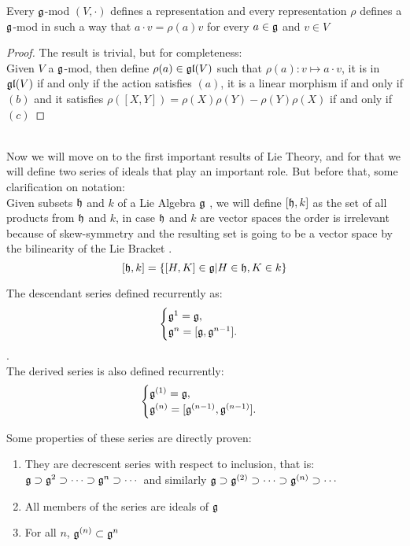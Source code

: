 \begin{prop}
	Every $\mathfrak{g}$-mod $(V,\cdot)$ defines a representation and every representation $\rho$ defines a $\mathfrak{g}$-mod in such a way that $a \cdot v = \rho(a)v$ for every $a \in \mathfrak{g}$ and $v \in V$
	\label{modequivrep}
\end{prop}
\begin{proof}
	The result is trivial, but for completeness:\\
	Given $V$ a $\mathfrak{g}$-mod, then define $\rho(a) \in \mathfrak{gl}(V)$ such that $\rho(a): v \mapsto a \cdot v$, it is in $\mathfrak{gl}(V)$ if and only if the action satisfies $(a)$, it is a linear morphism if and only if $(b)$ and it satisfies $\rho([X,Y])=\rho(X)\rho(Y)-\rho(Y)\rho(X)$ if and only if $(c)$
\end{proof}\\
Now we will move on to the first important results of Lie Theory, and for that we will define two series of ideals that play an important role. But before that, some clarification on notation:\\
Given subsets $\mathfrak{h}$ and $k$ of a Lie Algebra $\mathfrak{g}$ , we will define $[\mathfrak{h},k]$ as the set of all products from $\mathfrak{h}$ and $k$, in case $\mathfrak{h}$ and $k$ are vector spaces the order is irrelevant because of skew-symmetry and the resulting set is going to be a vector space by the bilinearity of the Lie Bracket . $$[\mathfrak{h},k] = \{[H,K] \in \mathfrak{g} | H \in \mathfrak{h}, K \in k\}$$
\begin{defi}
	The descendant series defined recurrently as:$$\begin{cases}
	\mathfrak{g}^1 = \mathfrak{g}, \\
	\mathfrak{g}^n = [\mathfrak{g},\mathfrak{g}^{n-1}].
	\end{cases}$$.\\
	The derived series is also defined recurrently: $$\begin{cases}
	\mathfrak{g}^{(1)} = \mathfrak{g},\\
	\mathfrak{g}^{(n)} = [\mathfrak{g}^{(n-1)},\mathfrak{g}^{(n-1)}].
	\end{cases}$$
	\label{13series}
\end{defi}
Some properties of these series are directly proven:
\begin{prop}
	\begin{enumerate}[label=\alph*.]
		\item They are decrescent series with respect to inclusion, that is:\\
		$\mathfrak{g} \supset \mathfrak{g}^2 \supset \cdots \supset \mathfrak{g}^n \supset \cdots $
		and similarly $\mathfrak{g} \supset \mathfrak{g}^{(2)} \supset \cdots \supset \mathfrak{g}^{(n)} \supset \cdots$
		\item All members of the series are ideals of $\mathfrak{g}$
		\item For all $n$,  $\mathfrak{g}^{(n)}\subset \mathfrak{g}^n$
	\end{enumerate}
	\label{13seriesprop}
\end{prop}
